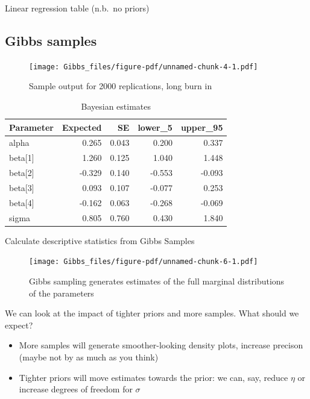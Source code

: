 \documentclass[
  letterpaper,
]{book}
\providecommand{\tightlist}{%
  \setlength{\itemsep}{0pt}\setlength{\parskip}{0pt}}\usepackage{longtable,booktabs,array}
\begin{document}
Linear regression table (n.b.~no priors)

\hypertarget{gibbs-samples}{%
\subsection{Gibbs samples}\label{gibbs-samples}}

\begin{figure}

{\centering \texttt{[image: Gibbs\_files/figure-pdf/unnamed-chunk-4-1.pdf]}

}

\caption{Sample output for 2000 replications, long burn in}

\end{figure}

\begin{table}

\caption{Bayesian estimates}
\centering
\begin{tabular}[t]{lrrrr}
\toprule
Parameter & Expected & SE & lower\_5 & upper\_95\\
\midrule
alpha & 0.265 & 0.043 & 0.200 & 0.337\\
beta[1] & 1.260 & 0.125 & 1.040 & 1.448\\
beta[2] & -0.329 & 0.140 & -0.553 & -0.093\\
beta[3] & 0.093 & 0.107 & -0.077 & 0.253\\
beta[4] & -0.162 & 0.063 & -0.268 & -0.069\\
\addlinespace
sigma & 0.805 & 0.760 & 0.430 & 1.840\\
\bottomrule
\end{tabular}
\end{table}

Calculate descriptive statistics from Gibbs Samples

\begin{figure}

{\centering \texttt{[image: Gibbs\_files/figure-pdf/unnamed-chunk-6-1.pdf]}

}

\caption{Gibbs sampling generates estimates of the full marginal
distributions of the parameters}

\end{figure}

We can look at the impact of tighter priors and more samples. What
should we expect?

\begin{itemize}
\tightlist
\item
  More samples will generate smoother-looking density plots, increase
  precison (maybe not by as much as you think)
\item
  Tighter priors will move estimates towards the prior: we can, say,
  reduce \(\eta\) or increase degrees of freedom for \(\sigma\)
\end{itemize}
\end{document}
